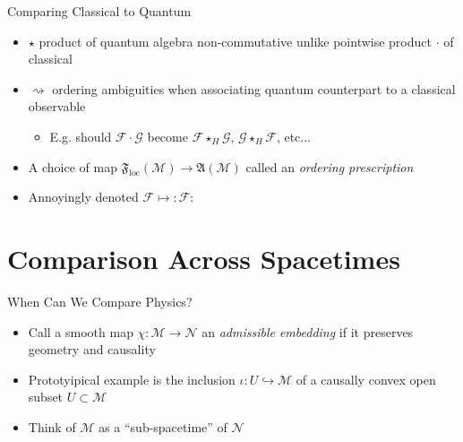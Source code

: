 \documentclass[pdf, fleqn, compress, handout]{beamer}
\newcommand{\nord}[1]{\boldsymbol{:}\!#1\!\boldsymbol{:}}
\newcommand{\mathsterm}[1]{{\itshape\color{dark-teal!80}#1}}
\begin{document}
\begin{frame}{Comparing Classical to Quantum}
	\begin{itemize}
		\item	$\star$ product of quantum algebra non-commutative unlike
				pointwise product $\cdot$ of classical
		\item	$\rightsquigarrow$ ordering ambiguities when associating
				quantum counterpart to a classical observable
		\begin{itemize}
			\item	E.g. should $\mathcal{F} \cdot \mathcal{G}$ become
					$\mathcal{F} \star_H \mathcal{G}$, 
					$\mathcal{G} \star_H \mathcal{F}$, etc...
		\end{itemize}
		\item	A choice of map
				$
					\mathfrak{F}_\mathrm{loc}(\mathcal{M})
						\to
					\mathfrak{A}(\mathcal{M})
				$
				called an \mathsterm{ordering prescription}
		\item   Annoyingly denoted $\mathcal{F} \mapsto \nord{\mathcal{F}}$
	\end{itemize}
\end{frame}

\section{Comparison Across Spacetimes}

\begin{frame}{When Can We Compare Physics?}
	\begin{itemize}
		\item	Call a smooth map $\chi: \mathcal{M} \to \mathcal{N}$ an
				\mathsterm{admissible embedding} if it preserves
				geometry and causality
		\item	Prototyipical example is the inclusion
				$\iota: U \hookrightarrow \mathcal{M}$
				of a causally convex open subset
				$U \subset \mathcal{M}$
		\item	Think of $\mathcal{M}$ as a ``sub-spacetime'' of $\mathcal{N}$
	\end{itemize}
\end{frame}
\end{document}
